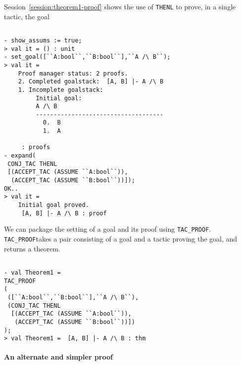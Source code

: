 Session~\ref{session:theorem1-proof} shows the use of \texttt{THENL}
to prove, in a single tactic, the goal 
\begin{session}
  \label{session:theorem1-proof}
  \begin{scriptsize}
\begin{verbatim}

- show_assums := true;
> val it = () : unit
- set_goal([``A:bool``,``B:bool``],``A /\ B``);
> val it =
    Proof manager status: 2 proofs.
    2. Completed goalstack:  [A, B] |- A /\ B
    1. Incomplete goalstack:
         Initial goal:
         A /\ B
         ------------------------------------
           0.  B
           1.  A
         
     : proofs
- expand(
 CONJ_TAC THENL
 [(ACCEPT_TAC (ASSUME ``A:bool``)),
  (ACCEPT_TAC (ASSUME ``B:bool``))]);
OK..
> val it =
    Initial goal proved.
     [A, B] |- A /\ B : proof
\end{verbatim}
  \end{scriptsize}
\end{session}

We can package the setting of a goal and its proof using
\verb|TAC_PROOF|. \verb|TAC_PROOF|takes a pair consisting of a goal
and a tactic proving the goal, and returns a theorem.

\begin{session}
  \label{session:tac-proof}
  \begin{scriptsize}
\begin{verbatim}

- val Theorem1 = 
TAC_PROOF
(
 ([``A:bool``,``B:bool``],``A /\ B``),
 (CONJ_TAC THENL
  [(ACCEPT_TAC (ASSUME ``A:bool``)),
   (ACCEPT_TAC (ASSUME ``B:bool``))])
);
> val Theorem1 =  [A, B] |- A /\ B : thm
\end{verbatim}
  \end{scriptsize}
\end{session}

\paragraph*{An alternate and simpler proof}
\label{sec:an-alternate-simpler}

